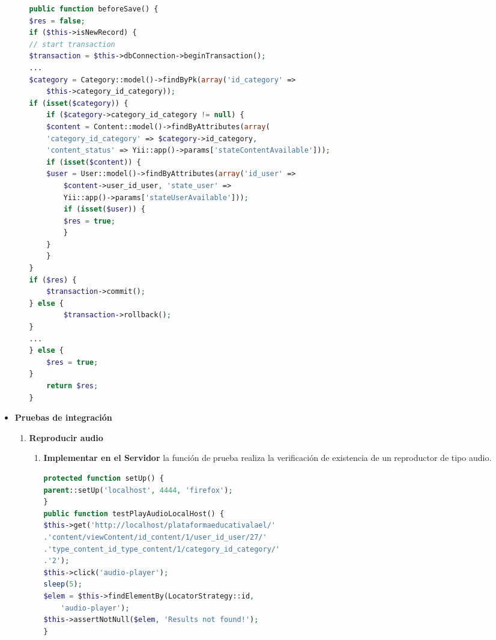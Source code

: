 \begin{itemize}
\begin{enumerate}
\begin{lstlisting}[language=PHP, caption={Función callback para control dependencia.}]
public function beforeSave() {
$res = false;
if ($this->isNewRecord) {
// start transaction
$transaction = $this->dbConnection->beginTransaction();
...
$category = Category::model()->findByPk(array('id_category' => 
    $this->category_id_category));
if (isset($category)) {
    if ($category->category_id_category != null) {
    $content = Content::model()->findByAttributes(array(
    'category_id_category' => $category->id_category, 
    'content_status' => Yii::app()->params['stateContentAvailable']));
    if (isset($content)) {
    $user = User::model()->findByAttributes(array('id_user' => 
        $content->user_id_user, 'state_user' => 
        Yii::app()->params['stateUserAvailable']));
        if (isset($user)) {
        $res = true;
        }
    }
    }
}
if ($res) {
    $transaction->commit();
} else {
        $transaction->rollback();
}
...
} else {
    $res = true;
}
    return $res;
}
\end{lstlisting}

\end{enumerate}

\item \textbf{Pruebas de integración}

\begin{enumerate}

\item \textbf{Reproducir audio}

\begin{enumerate}

\item \textbf{Implementar en el Servidor} la función de prueba
 realiza la verificación de existencia
de un reproductor de tipo audio.

\begin{lstlisting}[language=PHP, caption={Prueba reproducir reproductor de audio.}]
protected function setUp() {
parent::setUp('localhost', 4444, 'firefox');
}
public function testPlayAudioLocalHost() {
$this->get('http://localhost/plataformaeducativalael/'
.'content/viewContent/id_content/1/user_id_user/27/'
.'type_content_id_type_content/1/category_id_category/'
.'2');
$this->click('audio-player');
sleep(5);
$elem = $this->findElementBy(LocatorStrategy::id,
    'audio-player');
$this->assertNotNull($elem, 'Results not found!');
} 
\end{lstlisting}

\end{enumerate}


\end{enumerate}
\end{itemize}
